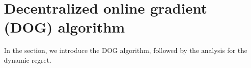 \documentclass{article}
\begin{document}
%
%
%
%




\section{Decentralized online gradient (DOG) algorithm} \label{sec:algorithm}
In the section, we introduce the DOG algorithm, followed by the analysis for the dynamic regret.
\end{document}

